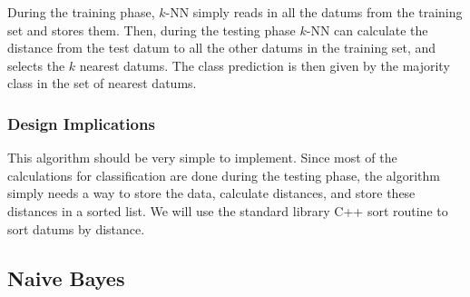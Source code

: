 \documentclass{article}
\begin{document}
				During the training phase, $k$-NN simply reads in all the datums from the training set and stores them. 
				Then, during the testing phase $k$-NN can calculate the distance from the test datum to all the other datums in the training set, and selects the $k$ nearest datums. 
				The class prediction is then given by the majority class in the set of nearest datums.
			\subsubsection{Design Implications}
				This algorithm should be very simple to implement. 
				Since most of the calculations for classification are done during the testing phase, the algorithm simply needs a way to store the data, calculate distances, and store these distances in a sorted list. 
				We will use the standard library C++ sort routine to sort datums by distance.
		\subsection{Naive Bayes}
			\label{nbw}
\end{document}
